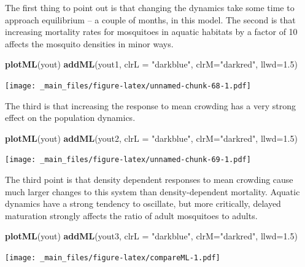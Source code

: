 \documentclass[
]{book}
\newenvironment{Shaded}{\begin{snugshade}}{\end{snugshade}}
\newcommand{\AttributeTok}[1]{\textcolor[rgb]{0.13,0.29,0.53}{#1}}
\newcommand{\FloatTok}[1]{\textcolor[rgb]{0.00,0.00,0.81}{#1}}
\newcommand{\FunctionTok}[1]{\textcolor[rgb]{0.13,0.29,0.53}{\textbf{#1}}}
\newcommand{\NormalTok}[1]{#1}
\newcommand{\StringTok}[1]{\textcolor[rgb]{0.31,0.60,0.02}{#1}}
\begin{document}
The first thing to point out is that changing the dynamics take some time to approach equilibrium -- a couple of months, in this model. The second is that increasing mortality rates for mosquitoes in aquatic habitats by a factor of 10 affects the mosquito densities in minor ways.

\begin{Shaded}
\begin{Highlighting}[]
\FunctionTok{plotML}\NormalTok{(yout)}
\FunctionTok{addML}\NormalTok{(yout1, }\AttributeTok{clrL =} \StringTok{"darkblue"}\NormalTok{, }\AttributeTok{clrM=}\StringTok{"darkred"}\NormalTok{, }\AttributeTok{llwd=}\FloatTok{1.5}\NormalTok{)}
\end{Highlighting}
\end{Shaded}

\texttt{[image: \_main\_files/figure-latex/unnamed-chunk-68-1.pdf]}

The third is that increasing the response to mean crowding has a very strong effect on the population dynamics.

\begin{Shaded}
\begin{Highlighting}[]
\FunctionTok{plotML}\NormalTok{(yout)}
\FunctionTok{addML}\NormalTok{(yout2, }\AttributeTok{clrL =} \StringTok{"darkblue"}\NormalTok{, }\AttributeTok{clrM=}\StringTok{"darkred"}\NormalTok{, }\AttributeTok{llwd=}\FloatTok{1.5}\NormalTok{)}
\end{Highlighting}
\end{Shaded}

\texttt{[image: \_main\_files/figure-latex/unnamed-chunk-69-1.pdf]}

The third point is that density dependent responses to mean crowding cause much larger changes to this system than density-dependent mortality. Aquatic dynamics have a strong tendency to oscillate, but more critically, delayed maturation strongly affects the ratio of adult mosquitoes to adults.

\begin{Shaded}
\begin{Highlighting}[]
\FunctionTok{plotML}\NormalTok{(yout)}
\FunctionTok{addML}\NormalTok{(yout3, }\AttributeTok{clrL =} \StringTok{"darkblue"}\NormalTok{, }\AttributeTok{clrM=}\StringTok{"darkred"}\NormalTok{, }\AttributeTok{llwd=}\FloatTok{1.5}\NormalTok{)}
\end{Highlighting}
\end{Shaded}

\texttt{[image: \_main\_files/figure-latex/compareML-1.pdf]}
\end{document}
